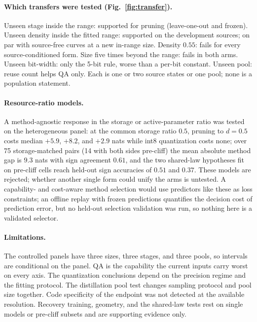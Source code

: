 \paragraph{Which transfers were tested (Fig.~\ref{fig:transfer}).}
Unseen stage inside the range: supported for pruning (leave-one-out and
frozen). Unseen density inside the fitted range: supported on the
development sources; on par with source-free curves at a new in-range
size. Density $0.55$: fails for every source-conditioned form. Size
five times beyond the range: fails in both arms. Unseen bit-width: only
the 5-bit rule, worse than a per-bit constant. Unseen pool: reuse count
helps QA only. Each is one or two source states or one pool; none is a
population statement.

\paragraph{Resource-ratio models.} A method-agnostic response in the
storage or active-parameter ratio was tested on the heterogeneous
panel: at the common storage ratio $0.5$, pruning to $d=0.5$ costs
median $+5.9$, $+8.2$, and $+2.9$ nats while int8 quantization costs
none; over 75 storage-matched pairs (14 with both sides pre-cliff) the
mean absolute method gap is $9.3$ nats with sign agreement $0.61$, and
the two shared-law hypotheses fit on pre-cliff cells reach held-out
sign accuracies of $0.51$ and $0.37$. These models are rejected;
whether another single form could unify the arms is untested. A
capability- and cost-aware method selection would use predictors like
these as loss constraints; an offline replay with frozen predictions
quantifies the decision cost of prediction error, but no held-out
selection validation was run, so nothing here is a validated selector.

\paragraph{Limitations.} The controlled panels have three sizes, three
stages, and three pools, so intervals are conditional on the panel. QA
is the capability the current inputs carry worst on every axis. The
quantization conclusions depend on the precision regime and the fitting
protocol. The distillation pool test changes sampling protocol and pool
size together. Code specificity of the endpoint was not detected at the
available resolution. Recovery training, geometry, and the shared-law
tests rest on single models or pre-cliff subsets and are supporting
evidence only.
